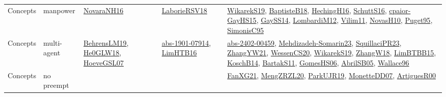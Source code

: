 {\begin{longtable}{lp{3cm}>{\raggedright}p{6cm}>{\raggedright}p{6cm}p{8cm}}
Concepts & manpower & \href{articles/NovaraNH16.pdf}{NovaraNH16}\cite{NovaraNH16} & \href{articles/LaborieRSV18.pdf}{LaborieRSV18}\cite{LaborieRSV18} & \href{articles/WikarekS19.pdf}{WikarekS19}\cite{WikarekS19}, \href{articles/BaptisteB18.pdf}{BaptisteB18}\cite{BaptisteB18}, \href{papers/HechingH16.pdf}{HechingH16}\cite{HechingH16}, \href{papers/SchuttS16.pdf}{SchuttS16}\cite{SchuttS16}, \href{papers/cpaior-GayHS15.pdf}{cpaior-GayHS15}\cite{cpaior-GayHS15}, \href{papers/GaySS14.pdf}{GaySS14}\cite{GaySS14}, \href{articles/LombardiM12.pdf}{LombardiM12}\cite{LombardiM12}, \href{papers/Vilim11.pdf}{Vilim11}\cite{Vilim11}, \href{articles/NovasH10.pdf}{NovasH10}\cite{NovasH10}, \href{papers/Puget95.pdf}{Puget95}\cite{Puget95}, \href{papers/SimonisC95.pdf}{SimonisC95}\cite{SimonisC95}\\
Concepts & multi-agent & \href{papers/BehrensLM19.pdf}{BehrensLM19}\cite{BehrensLM19}, \href{papers/He0GLW18.pdf}{He0GLW18}\cite{He0GLW18}, \href{papers/HoeveGSL07.pdf}{HoeveGSL07}\cite{HoeveGSL07} & \href{articles/abs-1901-07914.pdf}{abs-1901-07914}\cite{abs-1901-07914}, \href{papers/LimHTB16.pdf}{LimHTB16}\cite{LimHTB16} & \href{articles/abs-2402-00459.pdf}{abs-2402-00459}\cite{abs-2402-00459}, \href{papers/Mehdizadeh-Somarin23.pdf}{Mehdizadeh-Somarin23}\cite{Mehdizadeh-Somarin23}, \href{papers/SquillaciPR23.pdf}{SquillaciPR23}\cite{SquillaciPR23}, \href{articles/ZhangYW21.pdf}{ZhangYW21}\cite{ZhangYW21}, \href{papers/WessenCS20.pdf}{WessenCS20}\cite{WessenCS20}, \href{articles/WikarekS19.pdf}{WikarekS19}\cite{WikarekS19}, \href{articles/ZhangW18.pdf}{ZhangW18}\cite{ZhangW18}, \href{papers/LimBTBB15.pdf}{LimBTBB15}\cite{LimBTBB15}, \href{papers/KoschB14.pdf}{KoschB14}\cite{KoschB14}, \href{articles/BartakS11.pdf}{BartakS11}\cite{BartakS11}, \href{papers/GomesHS06.pdf}{GomesHS06}\cite{GomesHS06}, \href{papers/AbrilSB05.pdf}{AbrilSB05}\cite{AbrilSB05}, \href{articles/Wallace96.pdf}{Wallace96}\cite{Wallace96}\\
Concepts & no preempt &  &  & \href{articles/FanXG21.pdf}{FanXG21}\cite{FanXG21}, \href{articles/MengZRZL20.pdf}{MengZRZL20}\cite{MengZRZL20}, \href{papers/ParkUJR19.pdf}{ParkUJR19}\cite{ParkUJR19}, \href{papers/MonetteDD07.pdf}{MonetteDD07}\cite{MonetteDD07}, \href{articles/ArtiguesR00.pdf}{ArtiguesR00}\cite{ArtiguesR00}\\

\end{longtable}}
